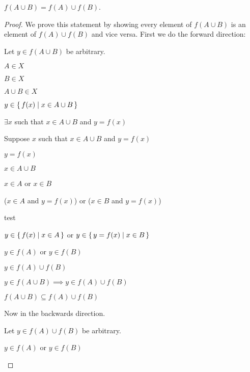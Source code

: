 \documentclass[../../main.tex]{subfiles}
\begin{document}
\begin{q}
\begin{enumerate}
        \item $f(A \cup B) = f(A) \cup f(B)$.
        \begin{proof}
            We prove this statement by showing every element of $f(A \cup B)$ is an element of $f(A) \cup f(B)$ and vice versa.
            First we do the forward direction:
            \begin{lxl}
                \item Let $y \in f(A \cup B)$ be arbitrary.
                \item $A \in X$
                \item $B \in X$
                \item $A \cup B \in X$
                \item $y \in \{\,f(x)\mid x \in A \cup B\,\}$
                \item $\exists x$ such that $x \in A \cup B$ and $y=f(x)$
                \item Suppose $x$ such that $x \in A \cup B$ and $y=f(x)$
                \begin{lxl}
                    \item $y = f(x)$
                    \item $x \in A \cup B$
                    \item $x \in A$ or $x \in B$
                    \item ($x \in A$ and $y=f(x)$) or ($x \in B$ and $y=f(x)$)
                    \begin{lxl}
                        \item{test}
                    \end{lxl}
                    \item $y \in \{\,f(x)\mid x \in A\,\}$ or $y \in \{\,y=f(x)\mid x \in B\,\}$
                    \item $y \in f(A)$ or $y \in f(B)$
                    \item $y \in f(A) \cup f(B)$
                \end{lxl}
                \item $y \in f(A \cup B) \implies y \in f(A) \cup f(B)$
                \item $f(A \cup B) \subseteq f(A) \cup f(B)$
            \end{lxl}
            Now in the backwards direction.
            \begin{lxl}
                \item Let $y \in f(A) \cup f(B)$ be arbitrary.
                \item $y \in f(A)$ or $y \in f(B)$

\end{lxl}
\end{proof}
\end{enumerate}
\end{q}
\end{document}
